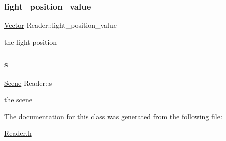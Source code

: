 \subsubsection{\texorpdfstring{light\+\_\+position\+\_\+value}{light\_position\_value}}
{\footnotesize\ttfamily \hyperlink{classVector}{Vector} Reader\+::light\+\_\+position\+\_\+value}

the light position \mbox{\label{classReader_a84df722b393b595cded39ae6654febc5}} 
\subsubsection{\texorpdfstring{s}{s}}
{\footnotesize\ttfamily \hyperlink{classScene}{Scene} Reader\+::s}

the scene 

The documentation for this class was generated from the following file\+:\begin{DoxyCompactItemize}
\item 
\hyperlink{Reader_8h}{Reader.\+h}\end{DoxyCompactItemize}
